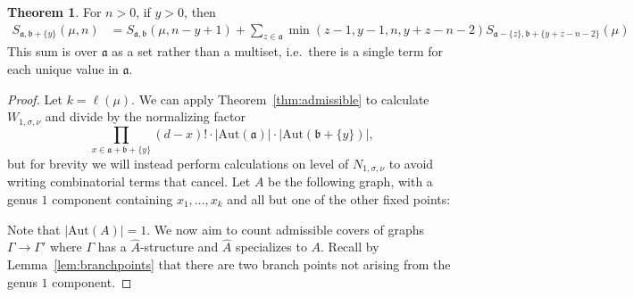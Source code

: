 \documentclass[thesis]{thesis-umich}           %
\newcommand{\Aut}{\text{Aut}}
\renewcommand{\a}{\mathfrak a}
\renewcommand{\b}{\mathfrak b}
\theoremstyle{definition}
\newtheorem{thm}{Theorem}[section]
\begin{document}
\begin{thm}
  \label{thm:reduceb}
  For $n>0$, if $y>0$, then
  \begin{align*}
    S_{\mathfrak a,\mathfrak b+\{y\}}(\mu, n) &=S_{\mathfrak a,\mathfrak b}(\mu, n-y+1) +\sum_{z\in\mathfrak a}\min(z-1,y-1,n,y+z-n-2)S_{\mathfrak a-\{z\},\mathfrak b+\{y+z-n-2\}}(\mu)
  \end{align*}
  This sum is over $\a$ as a set rather than a multiset, i.e.\ there is
  a single term for each unique value in $\a$.
\end{thm}

\begin{proof}
  Let $k=\ell(\mu)$. We can apply Theorem~\ref{thm:admissible}
  to calculate $W_{1,\sigma,\nu}$ and divide by the normalizing factor
  \[ 
  \prod_{x\in\a+\b+\{y\}}(d-x)!\cdot |\Aut(\a)|\cdot |\Aut(\b+\{y\})|,
  \]
  but for brevity we will instead perform calculations on level of
  $N_{1,\sigma,\nu}$ to avoid writing combinatorial terms that cancel.
  Let $A$ be the following graph,
  with a genus $1$ component containing $x_1,\dots,x_k$ and all but one
  of the other fixed points:


                  Note that $|\Aut(A)|=1$.
We now aim to count admissible covers of graphs $\Gamma\to\Gamma'$ where $\Gamma$ has a $\hat A$-structure and $\hat A$ specializes to $A$.
Recall by Lemma~\ref{lem:branchpoints} that there are two branch points not
  arising from the genus $1$ component.
  

\end{proof}
\end{document}
